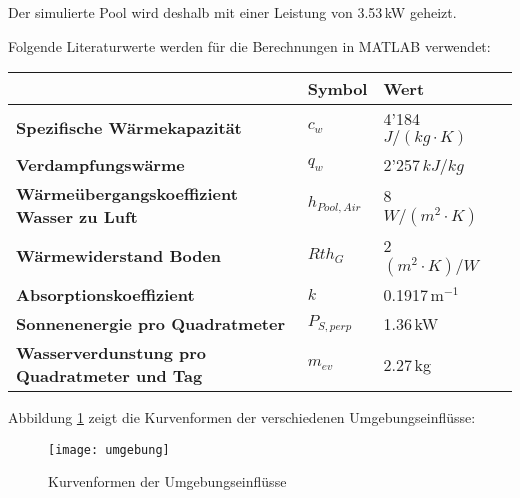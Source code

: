 Der simulierte Pool wird deshalb mit einer Leistung von 3.53\,kW geheizt.

\newpage
Folgende Literaturwerte werden für die Berechnungen in MATLAB verwendet:

\begin{table}[H]
	\centering
	\renewcommand{\arraystretch}{1.2}
	\begin{tabular}{l|l|lc}
		 & \textbf{Symbol}											& \multicolumn{2}{l}{\textbf{Wert}}	\\ \hline
		\textbf{Spezifische Wärmekapazität}						& $c_{\si{w}}$ 		& 4'184\,$\si{J}/(\si{kg}\cdot \si{K})$ 		& \cite{Wassereigenschaften} 	\\
		\textbf{Verdampfungswärme}								& $q_{\si{w}}$ 		& 2'257\,$kJ/kg$ 							& \cite{Wassereigenschaften} 	\\
		\textbf{Wärmeübergangskoeffizient Wasser zu Luft}			& $h_{\si{Pool, Air}}$ & 8\,$\si{W}/(\si{m}^2\cdot \si{K})$		& \cite{Waermeuebergang}		\\
		\textbf{Wärmewiderstand Boden} 					& $Rth_{\si{G}}$ 		& 2\,$(\si{m}^2\cdot \si{K})/\si{W}$		& \cite{Betonwiderstand}		\\
		\textbf{Absorptionskoeffizient} 							& $k$				& 0.1917\,m$^{-1}$							& \cite{Waermekoeffizient}		\\
		\textbf{Sonnenenergie pro Quadratmeter}					& $P_{\si{S, perp}}$	& 1.36\,kW									& \cite{EnergieDerSonne}		\\
		\textbf{Wasserverdunstung pro Quadratmeter und Tag}	& $m_{\si{ev}}$		& 2.27\,kg 									& \cite{WasserVerdunsten}
	\end{tabular}
\end{table}

Abbildung \ref{fig:umgebung} zeigt die Kurvenformen der verschiedenen Umgebungseinflüsse:

\begin{figure}[H]
	\centering
	\texttt{[image: umgebung]}
	\caption{Kurvenformen der Umgebungseinflüsse}
	\label{fig:umgebung}
\end{figure}
